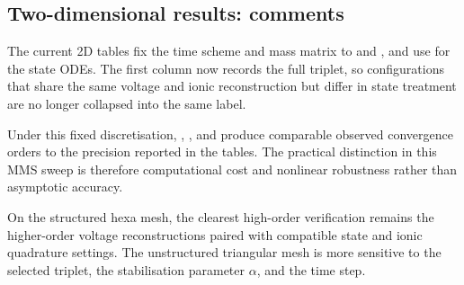 \subsection{Two-dimensional results: comments}
\label{sec:results-2d-conclusions}

The current 2D tables fix the time scheme and mass matrix to  and , and use  for the state ODEs. The first column now records the full  triplet, so configurations that share the same voltage and ionic reconstruction but differ in state treatment are no longer collapsed into the same label.

Under this fixed discretisation, , , and  produce comparable observed convergence orders to the precision reported in the tables. The practical distinction in this MMS sweep is therefore computational cost and nonlinear robustness rather than asymptotic accuracy.

On the structured hexa mesh, the clearest high-order verification remains the higher-order voltage reconstructions paired with compatible state and ionic quadrature settings. The unstructured triangular mesh is more sensitive to the selected  triplet, the stabilisation parameter $\alpha$, and the time step.
